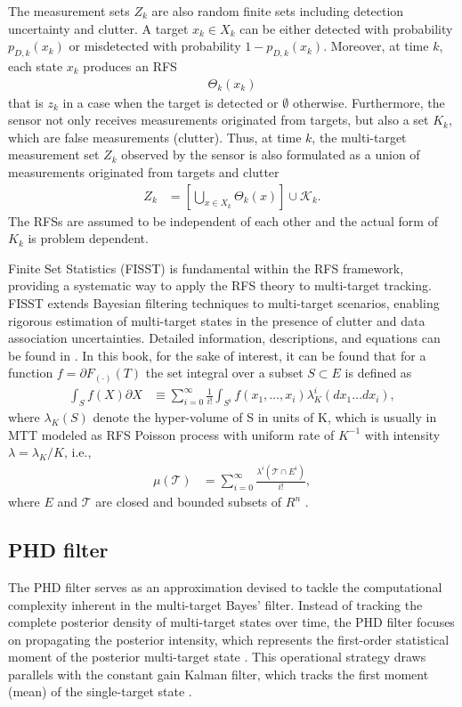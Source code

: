 The measurement sets $Z_k$ are also random finite sets including detection uncertainty and clutter. A target $x_k \in X_k$ can be either detected with probability $p_{D,k}(x_k)$ or misdetected with probability $1-p_{D,k}(x_k)$. Moreover, at time $k$, each state $x_k$ produces an RFS
\begin{align}
    \Theta_k(x_k)
\end{align}
that is ${z_k}$ in a case when the target is detected or $\emptyset$ otherwise. Furthermore, the sensor not only
receives measurements originated from targets, but also a set $K_k$, which are false measurements (clutter). Thus, at
time $k$, the multi-target measurement set $Z_k$ observed by the sensor is also formulated as a union of measurements
originated from targets and clutter
\begin{align}
    Z_k &= \left[ \bigcup_{x \in X_k} \Theta_k(x) \right] \cup \mathcal{K}_k. \label{eq:rfs_measurement_union}
\end{align}
The RFSs are assumed to be independent of each other and the actual form of $K_k$ is problem dependent.


Finite Set Statistics (FISST) is fundamental within the RFS framework, providing a systematic way to apply the RFS theory
to multi-target tracking. FISST extends Bayesian filtering techniques to multi-target scenarios, enabling rigorous
estimation of multi-target states in the presence of clutter and data association uncertainties. Detailed information, descriptions, and equations can be found in \cite{FISSTgoodman1997}. In this book, for the sake of interest, it can be found that for a function $f=\partial F_{(\cdot)}(T)$ the set integral over a subset $S \subset E$ is
defined as
\begin{align}
    \int_{S}f(X)\partial X &\equiv \sum_{i=0}^{\infty} \frac{1}{i!}\int_{S^i} f({x_1,\dots,x_i})\lambda_K^i(dx_1\dots dx_i),
\end{align}
where $\lambda_K(S)$ denote the hyper-volume of S in units of K, which is usually in MTT modeled as RFS Poisson process with uniform rate of $K^{-1}$ with intensity $\lambda = \lambda_K/K$, i.e.,
\begin{align}
    \mu(\mathcal{T}) &= \sum_{i=0}^{\infty} \frac{\lambda^i(\mathcal{T} \cap E^i)}{i!},
\end{align}
where $E$ and $\mathcal{T}$ are closed and bounded subsets of $R^n$ \cite{VoRFS2003}.

        \subsection{PHD filter}
\label{sec:phdfilter}
The PHD filter serves as an approximation devised to tackle the computational complexity inherent in the multi-target Bayes' filter. Instead of tracking the complete posterior density of multi-target states over time, the PHD filter focuses on propagating the posterior intensity, which represents the first-order statistical moment of the posterior multi-target state \cite{mahler}. This operational strategy draws parallels with the constant gain Kalman filter, which tracks the first moment (mean) of the single-target state \cite{VoMaPHD2006}.

